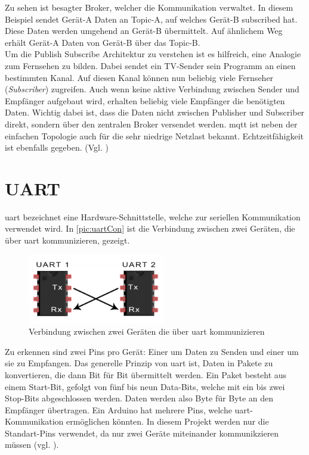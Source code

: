 \newpage Zu sehen ist besagter Broker, welcher die Kommunikation verwaltet. In diesem Beispiel sendet  Gerät-A Daten an Topic-A, auf welches Gerät-B subscribed hat. Diese Daten werden umgehend an Gerät-B übermittelt. Auf ähnlichem Weg erhält Gerät-A Daten von Gerät-B über das Topic-B.\\
Um die Publish Subscribe Architektur zu verstehen ist es hilfreich, eine Analogie zum Fernsehen zu bilden. Dabei sendet ein TV-Sender sein Programm an einen bestimmten Kanal.
Auf diesen Kanal können nun beliebig viele Fernseher (\textit{Subscriber}) zugreifen. Auch wenn keine aktive Verbindung zwischen Sender und Empfänger aufgebaut wird, erhalten beliebig viele Empfänger die benötigten Daten.
Wichtig dabei ist, dass die Daten nicht zwischen Publisher und Subscriber direkt, sondern über den zentralen Broker versendet werden. \acrshort{mqtt} ist neben der einfachen Topologie auch für die sehr niedrige Netzlast bekannt. Echtzeitfähigkeit ist ebenfalls gegeben. (Vgl. \cite{mqtt})



\section{UART}
\label{sec:uart}
\acrfull{uart} bezeichnet eine Hardware-Schnittstelle, welche zur seriellen Kommunikation verwendet wird. In \autoref{pic:uartCon} ist die Verbindung zwischen zwei Geräten, die über \acrshort{uart} kommunizieren, gezeigt.

\begin{figure}[h]
    \begin{center}
        \includegraphics[width=6cm]{uart.PNG}
        \caption{\label{pic:uartCon}Verbindung zwischen zwei Geräten die über \acrshort{uart} kommunizieren}
    \end{center}
\end{figure}

Zu erkennen sind zwei Pins pro Gerät: Einer um Daten zu Senden und einer um sie zu Empfangen. Das generelle Prinzip von \acrshort{uart} ist, Daten in Pakete zu konvertieren, die dann Bit für Bit übermittelt werden. Ein Paket besteht aus einem Start-Bit, gefolgt von fünf bis neun Data-Bits, welche mit ein bis zwei Stop-Bits abgeschlossen werden. Daten werden also Byte für Byte an den Empfänger übertragen. Ein Arduino hat mehrere Pins, welche \acrshort{uart}-Kommunikation ermöglichen könnten. In diesem Projekt werden nur die Standart-Pins verwendet, da nur zwei Geräte miteinander kommunikzieren müssen (vgl. \cite{uart}). 
\newpage
